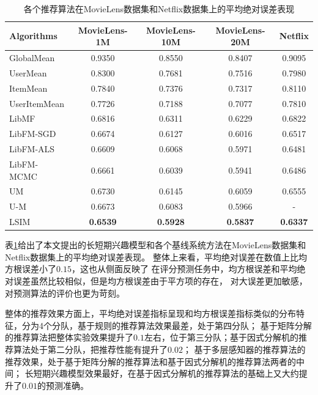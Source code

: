 \begin{table}[htbp]
    \centering
    \caption{各个推荐算法在MovieLens数据集和Netflix数据集上的平均绝对误差表现}
    \label{tab:mae}
    \begin{tabular}{|l|c|c|c|c|}
        \hline
        \textbf{Algorithms} & \textbf{MovieLens-1M} & \textbf{MovieLens-10M} & \textbf{MovieLens-20M} & \textbf{Netflix} \\
        \hline
        GlobalMean   & 0.9350          & 0.8550          & 0.8407          & 0.9095          \\
        UserMean     & 0.8300          & 0.7681          & 0.7516          & 0.7980          \\
        ItemMean     & 0.7840          & 0.7376          & 0.7317          & 0.8110          \\
        UserItemMean & 0.7726          & 0.7188          & 0.7077          & 0.7810          \\
        \hline
        LibMF        & 0.6816          & 0.6311          & 0.6229          & 0.6822          \\
        \hline
        LibFM-SGD    & 0.6674          & 0.6127          & 0.6016          & 0.6517          \\
        LibFM-ALS    & 0.6609          & 0.6068          & 0.5971          & 0.6481          \\
        LibFM-MCMC   & 0.6661          & 0.6039          & 0.5941          & 0.6486          \\
        \hline
        UM           & 0.6730          & 0.6145          & 0.6059          & 0.6555          \\
        U-M          & 0.6673          & 0.6083          & 0.5966          & -               \\
        \hline
        LSIM         & \textbf{0.6539} & \textbf{0.5928} & \textbf{0.5837} & \textbf{0.6337} \\
        \hline
    \end{tabular}
\end{table}

表\ref{tab:mae}给出了本文提出的长短期兴趣模型和各个基线系统方法在MovieLens数据集和Netflix数据集上的平均绝对误差表现。
整体上来看，平均绝对误差在数值上比均方根误差小了$0.15$，这也从侧面反映了
在评分预测任务中，均方根误差和平均绝对误差虽然比较相似，但是均方根误差由于平方项的存在，
对大误差更加敏感，对预测算法的评价也更为苛刻。

整体的推荐效果方面上，平均绝对误差指标呈现和均方根误差指标类似的分布特征，分为4个分队，基于规则的推荐算法效果最差，处于第四分队；
基于矩阵分解的推荐算法把整体实验效果提升了$0.1$左右，位于第三分队；基于因式分解机的推荐算法处于第二分队，把推荐性能有提升了$0.02$；
基于多层感知器的推荐算法的推荐效果，处于基于矩阵分解的推荐算法和基于因式分解机的推荐算法两者的中间；
长短期兴趣模型效果最好，在基于因式分解机的推荐算法的基础上又大约提升了$0.01$的预测准确。

